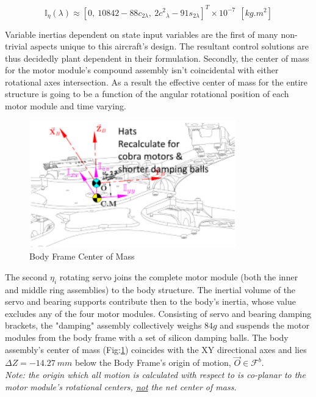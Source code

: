\begin{equation}\label{eq:inertia.middle.vpa}
\mathbb{I}_\eta(\lambda)\approx[0,~ 10842-88{c}_{2\lambda},~ 2{c^2}_{\lambda}-91s_{2\lambda}]^T\times10^{-7}~~[kg.m^2]
\end{equation}
\par
Variable inertias dependent on state input variables are the first of many non-trivial aspects unique to this aircraft's design. The resultant control solutions are thus decidedly plant dependent in their formulation. Secondly, the center of mass for the motor module's compound assembly isn't coincidental with either rotational axes intersection. As a result the effective center of mass for the entire structure is going to be a function of the angular rotational position of each motor module and time varying.
\par
\begin{figure}[htbp]
\centering
\includegraphics[width=0.8\textwidth]{figs/inertia-center}
\caption{Body Frame Center of Mass}
\label{fig:inertia-center}
\end{figure}
The second $\eta_i$ rotating servo joins the complete motor module (both the inner and middle ring assemblies) to the body structure. The inertial volume of the servo and bearing supports contribute then to the body's inertia, whose value excludes any of the four motor modules. Consisting of servo and bearing damping brackets, the "damping" assembly collectively weighs $84g$ and suspends the motor modules from the body frame with a set of silicon damping balls. The body assembly's center of mass (Fig:\ref{fig:inertia-center}) coincides with the XY directional axes and lies $\Delta Z=-14.27~mm$ below the Body Frame's origin of motion, $\vec{O}\in\mathcal{F}^b$.
\\
\emph{\color{Gray}Note: the origin which all motion is calculated with respect to is co-planar to the motor module's rotational centers, \underline{not} the net center of mass.}
